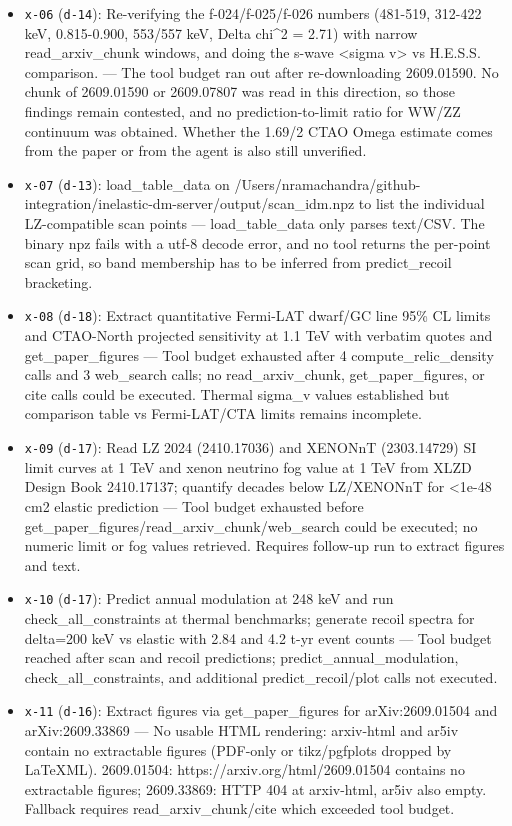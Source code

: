 \documentclass[11pt,a4paper]{article}
\begin{document}
\begin{itemize}
  \item \texttt{x-06} (\texttt{d-14}): Re-verifying the f-024/f-025/f-026 numbers (481-519, 312-422 keV, 0.815-0.900, 553/557 keV, Delta chi\textasciicircum{}2 = 2.71) with narrow read\_arxiv\_chunk windows, and doing the s-wave \textless{}sigma v\textgreater{} vs H.E.S.S. comparison. --- The tool budget ran out after re-downloading 2609.01590. No chunk of 2609.01590 or 2609.07807 was read in this direction, so those findings remain contested, and no prediction-to-limit ratio for WW/ZZ continuum was obtained. Whether the 1.69/2 CTAO Omega estimate comes from the paper or from the agent is also still unverified.
  \item \texttt{x-07} (\texttt{d-13}): load\_table\_data on /Users/nramachandra/github-integration/inelastic-dm-server/output/scan\_idm.npz to list the individual LZ-compatible scan points --- load\_table\_data only parses text/CSV. The binary npz fails with a utf-8 decode error, and no tool returns the per-point scan grid, so band membership has to be inferred from predict\_recoil bracketing.
  \item \texttt{x-08} (\texttt{d-18}): Extract quantitative Fermi-LAT dwarf/GC line 95\% CL limits and CTAO-North projected sensitivity at 1.1 TeV with verbatim quotes and get\_paper\_figures --- Tool budget exhausted after 4 compute\_relic\_density calls and 3 web\_search calls; no read\_arxiv\_chunk, get\_paper\_figures, or cite calls could be executed. Thermal sigma\_v values established but comparison table vs Fermi-LAT/CTA limits remains incomplete.
  \item \texttt{x-09} (\texttt{d-17}): Read LZ 2024 (2410.17036) and XENONnT (2303.14729) SI limit curves at 1 TeV and xenon neutrino fog value at 1 TeV from XLZD Design Book 2410.17137; quantify decades below LZ/XENONnT for \textless{}1e-48 cm2 elastic prediction --- Tool budget exhausted before get\_paper\_figures/read\_arxiv\_chunk/web\_search could be executed; no numeric limit or fog values retrieved. Requires follow-up run to extract figures and text.
  \item \texttt{x-10} (\texttt{d-17}): Predict annual modulation at 248 keV and run check\_all\_constraints at thermal benchmarks; generate recoil spectra for delta=200 keV vs elastic with 2.84 and 4.2 t-yr event counts --- Tool budget reached after scan and recoil predictions; predict\_annual\_modulation, check\_all\_constraints, and additional predict\_recoil/plot calls not executed.
  \item \texttt{x-11} (\texttt{d-16}): Extract figures via get\_paper\_figures for arXiv:2609.01504 and arXiv:2609.33869 --- No usable HTML rendering: arxiv-html and ar5iv contain no extractable figures (PDF-only or tikz/pgfplots dropped by LaTeXML). 2609.01504: https://arxiv.org/html/2609.01504 contains no extractable figures; 2609.33869: HTTP 404 at arxiv-html, ar5iv also empty. Fallback requires read\_arxiv\_chunk/cite which exceeded tool budget.

\end{itemize}
\end{document}
